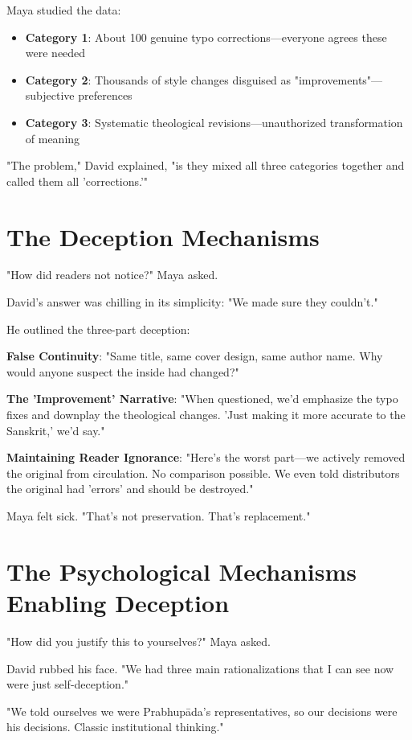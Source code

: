 \documentclass[11pt,twoside]{book}
\begin{document}
Maya studied the data:
\begin{itemize}
\item \textbf{\textbf{Category 1}}: About 100 genuine typo corrections—everyone agrees these were needed
\item \textbf{\textbf{Category 2}}: Thousands of style changes disguised as "improvements"—subjective preferences
\item \textbf{\textbf{Category 3}}: Systematic theological revisions—unauthorized transformation of meaning
\end{itemize}

"The problem," David explained, "is they mixed all three categories together and called them all 'corrections.'"
\section*{The Deception Mechanisms}
\label{sec:org9a1eaa5}

"How did readers not notice?" Maya asked.

David's answer was chilling in its simplicity: "We made sure they couldn't."

He outlined the three-part deception:

\textbf{\textbf{False Continuity}}: "Same title, same cover design, same author name. Why would anyone suspect the inside had changed?"

\textbf{\textbf{The 'Improvement' Narrative}}: "When questioned, we'd emphasize the typo fixes and downplay the theological changes. 'Just making it more accurate to the Sanskrit,' we'd say."

\textbf{\textbf{Maintaining Reader Ignorance}}: "Here's the worst part—we actively removed the original from circulation. No comparison possible. We even told distributors the original had 'errors' and should be destroyed."

Maya felt sick. "That's not preservation. That's replacement."
\section*{The Psychological Mechanisms Enabling Deception}
\label{sec:orge0e9d71}

"How did you justify this to yourselves?" Maya asked.

David rubbed his face. "We had three main rationalizations that I can see now were just self-deception."

"We told ourselves we were Prabhupāda's representatives, so our decisions were his decisions. Classic institutional thinking."
\end{document}
